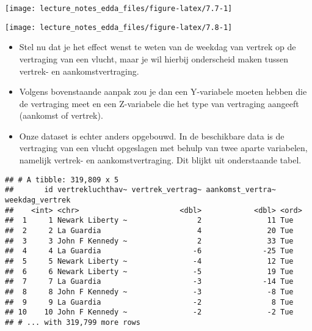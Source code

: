 \documentclass[]{memoir}
\providecommand{\tightlist}{%
  \setlength{\itemsep}{0pt}\setlength{\parskip}{0pt}}
\begin{document}
\texttt{[image: lecture\_notes\_edda\_files/figure-latex/7.7-1]}

\texttt{[image: lecture\_notes\_edda\_files/figure-latex/7.8-1]}

\begin{itemize}
\tightlist
\item
  Stel nu dat je het effect wenst te weten van de weekdag van vertrek op de vertraging van een vlucht, maar je wil hierbij onderscheid maken tussen vertrek- en aankomstvertraging.
\item
  Volgens bovenstaande aanpak zou je dan een Y-variabele moeten hebben die de vertraging meet en een Z-variabele die het type van vertraging aangeeft (aankomst of vertrek).
\item
  Onze dataset is echter anders opgebouwd. In de beschikbare data is de vertraging van een vlucht opgeslagen met behulp van twee aparte variabelen, namelijk vertrek- en aankomstvertraging. Dit blijkt uit onderstaande tabel.
\end{itemize}

\begin{verbatim}
## # A tibble: 319,809 x 5
##       id vertrekluchthav~ vertrek_vertrag~ aankomst_vertra~ weekdag_vertrek
##    <int> <chr>                       <dbl>            <dbl> <ord>          
##  1     1 Newark Liberty ~                2               11 Tue            
##  2     2 La Guardia                      4               20 Tue            
##  3     3 John F Kennedy ~                2               33 Tue            
##  4     4 La Guardia                     -6              -25 Tue            
##  5     5 Newark Liberty ~               -4               12 Tue            
##  6     6 Newark Liberty ~               -5               19 Tue            
##  7     7 La Guardia                     -3              -14 Tue            
##  8     8 John F Kennedy ~               -3               -8 Tue            
##  9     9 La Guardia                     -2                8 Tue            
## 10    10 John F Kennedy ~               -2               -2 Tue            
## # ... with 319,799 more rows
\end{verbatim}
\end{document}
